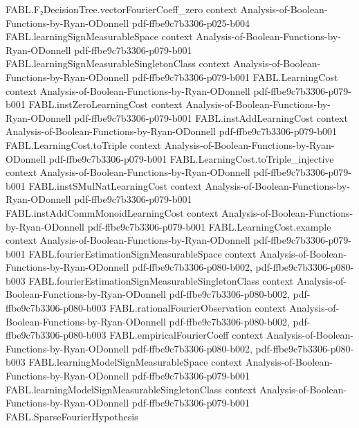 \begin{theorem}
\proofstep
  {FABL.F₂DecisionTree.vectorFourierCoeff_zero}
  {context}
  {Analysis-of-Boolean-Functions-by-Ryan-ODonnell}
  {pdf-ffbe9c7b3306-p025-b004}
\proofstep
  {FABL.learningSignMeasurableSpace}
  {context}
  {Analysis-of-Boolean-Functions-by-Ryan-ODonnell}
  {pdf-ffbe9c7b3306-p079-b001}
\proofstep
  {FABL.learningSignMeasurableSingletonClass}
  {context}
  {Analysis-of-Boolean-Functions-by-Ryan-ODonnell}
  {pdf-ffbe9c7b3306-p079-b001}
\proofstep
  {FABL.LearningCost}
  {context}
  {Analysis-of-Boolean-Functions-by-Ryan-ODonnell}
  {pdf-ffbe9c7b3306-p079-b001}
\proofstep
  {FABL.instZeroLearningCost}
  {context}
  {Analysis-of-Boolean-Functions-by-Ryan-ODonnell}
  {pdf-ffbe9c7b3306-p079-b001}
\proofstep
  {FABL.instAddLearningCost}
  {context}
  {Analysis-of-Boolean-Functions-by-Ryan-ODonnell}
  {pdf-ffbe9c7b3306-p079-b001}
\proofstep
  {FABL.LearningCost.toTriple}
  {context}
  {Analysis-of-Boolean-Functions-by-Ryan-ODonnell}
  {pdf-ffbe9c7b3306-p079-b001}
\proofstep
  {FABL.LearningCost.toTriple_injective}
  {context}
  {Analysis-of-Boolean-Functions-by-Ryan-ODonnell}
  {pdf-ffbe9c7b3306-p079-b001}
\proofstep
  {FABL.instSMulNatLearningCost}
  {context}
  {Analysis-of-Boolean-Functions-by-Ryan-ODonnell}
  {pdf-ffbe9c7b3306-p079-b001}
\proofstep
  {FABL.instAddCommMonoidLearningCost}
  {context}
  {Analysis-of-Boolean-Functions-by-Ryan-ODonnell}
  {pdf-ffbe9c7b3306-p079-b001}
\proofstep
  {FABL.LearningCost.example}
  {context}
  {Analysis-of-Boolean-Functions-by-Ryan-ODonnell}
  {pdf-ffbe9c7b3306-p079-b001}
\proofstep
  {FABL.fourierEstimationSignMeasurableSpace}
  {context}
  {Analysis-of-Boolean-Functions-by-Ryan-ODonnell}
  {pdf-ffbe9c7b3306-p080-b002,
    pdf-ffbe9c7b3306-p080-b003}
\proofstep
  {FABL.fourierEstimationSignMeasurableSingletonClass}
  {context}
  {Analysis-of-Boolean-Functions-by-Ryan-ODonnell}
  {pdf-ffbe9c7b3306-p080-b002,
    pdf-ffbe9c7b3306-p080-b003}
\proofstep
  {FABL.rationalFourierObservation}
  {context}
  {Analysis-of-Boolean-Functions-by-Ryan-ODonnell}
  {pdf-ffbe9c7b3306-p080-b002,
    pdf-ffbe9c7b3306-p080-b003}
\proofstep
  {FABL.empiricalFourierCoeff}
  {context}
  {Analysis-of-Boolean-Functions-by-Ryan-ODonnell}
  {pdf-ffbe9c7b3306-p080-b002,
    pdf-ffbe9c7b3306-p080-b003}
\proofstep
  {FABL.learningModelSignMeasurableSpace}
  {context}
  {Analysis-of-Boolean-Functions-by-Ryan-ODonnell}
  {pdf-ffbe9c7b3306-p079-b001}
\proofstep
  {FABL.learningModelSignMeasurableSingletonClass}
  {context}
  {Analysis-of-Boolean-Functions-by-Ryan-ODonnell}
  {pdf-ffbe9c7b3306-p079-b001}
\proofstep
  {FABL.SparseFourierHypothesis}

\end{theorem}
